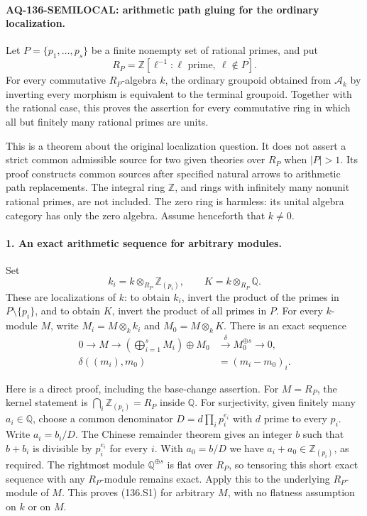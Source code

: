 \paragraph{AQ-136-SEMILOCAL: arithmetic path gluing for the ordinary localization.}
Let $P=\{p_1,\ldots,p_s\}$ be a finite nonempty set of rational
primes, and put
\[
 R_P=\mathbb Z[\ell^{-1}:\ell\text{ prime},\ \ell\notin P].
\]
For every commutative $R_P$-algebra $k$, the ordinary groupoid
obtained from $\mathcal A_k$ by inverting every morphism is
equivalent to the terminal groupoid. Together with the rational
case, this proves the assertion for every commutative ring in
which all but finitely many rational primes are units.

This is a theorem about the original localization question.
It does not assert a strict common admissible source for two
given theories over $R_P$ when $|P|>1$. Its proof constructs
common sources after specified natural arrows to arithmetic
path replacements. The integral ring $\mathbb Z$, and rings
with infinitely many nonunit rational primes, are not included.
The zero ring is harmless: its unital algebra category has
only the zero algebra. Assume henceforth that $k\ne0$.

\paragraph{1. An exact arithmetic sequence for arbitrary modules.}
Set
\[
 k_i=k\otimes_{R_P}\mathbb Z_{(p_i)},\qquad
 K=k\otimes_{R_P}\mathbb Q.
\]
These are localizations of $k$: to obtain $k_i$, invert the
product of the primes in $P\setminus\{p_i\}$, and to obtain
$K$, invert the product of all primes in $P$.
For every $k$-module $M$, write $M_i=M\otimes_k k_i$ and
$M_0=M\otimes_k K$. There is an exact sequence
\begin{equation}
 \begin{aligned}
 0\longrightarrow M\longrightarrow
       \left(\bigoplus_{i=1}^sM_i\right)\oplus M_0
   &\xrightarrow{\delta} M_0^{\oplus s}\longrightarrow0,\\
 \delta((m_i),m_0)&=(m_i-m_0)_i.
 \end{aligned}                                           \tag{136.S1}
\end{equation}

Here is a direct proof, including the base-change assertion.
For $M=R_P$, the kernel statement is
$\bigcap_i\mathbb Z_{(p_i)}=R_P$ inside $\mathbb Q$.
For surjectivity, given finitely many $a_i\in\mathbb Q$,
choose a common denominator
$D=d\prod_i p_i^{e_i}$ with $d$ prime to every $p_i$.
Write $a_i=b_i/D$. The Chinese remainder theorem gives an
integer $b$ such that $b+b_i$ is divisible by $p_i^{e_i}$
for every $i$. With $a_0=b/D$ we have
$a_i+a_0\in\mathbb Z_{(p_i)}$, as required.
The rightmost module $\mathbb Q^{\oplus s}$ is flat over
$R_P$, so tensoring this short exact sequence with any
$R_P$-module remains exact. Apply this to the underlying
$R_P$-module of $M$. This proves (136.S1) for arbitrary
$M$, with no flatness assumption on $k$ or on $M$.

